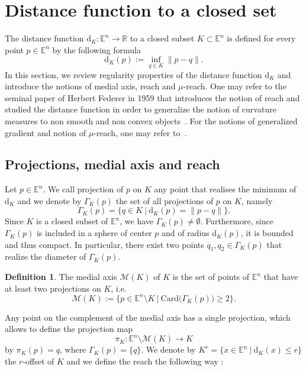 \documentclass[11pt,reqno,a4paper]{article}%
\theoremstyle{definition}
\newtheorem{definition}{Definition}[section]
\theoremstyle{remark}
\newtheorem{remark}{Remark}[section]
\renewcommand{\leq}{\leqslant}
\renewcommand{\geq}{\geqslant}
\renewcommand{\d}{\mathrm{d}}
\newcommand{\R}{\mathbb{R}}
\newcommand{\E}{\mathbb{E}}
\renewcommand{\d}{\mathrm{d}}
\begin{document}
\section{Distance function to a closed set}\label{sec:distancefunction}
The distance function $\d_K : \E^n \to \R$ to a closed subset $K\subset \E^n$ is defined for every point $p \in \E^n$ by the following formula
\[ \d_K(p) := \underset{q \in K}{\inf} \| p - q \|. \]
In this section, we review regularity properties of the distance function $\d_K$ and introduce the notions of medial axis, reach and $\mu$-reach. One may refer to the seminal paper of Herbert Federer in 1959 that introduces the notion of reach and studied the distance function in order to generalize the notion of curvature measures to non smooth and non convex objects~\cite{Federer59}. For the notions of generalized gradient and notion of $\mu$-reach, one may refer to~\cite{LIEUTIER20041029,chazal2006sampling}.
\subsection{Projections, medial axis and reach}
Let $p \in \E^n$. We call projection of $p$ on $K$ any point that realises the minimum of $\d_K$ and we denote by $\Gamma_K(p)$ the set of all projections of $p$ on $K$, namely
$$\Gamma_K(p) = \{ q \in K ~|~ \d_K(p) =  \| p - q \| \}. $$
Since $K$ is a closed subset of $\E^n$, we have $\Gamma_K(p) \neq \emptyset$. Furthermore, since $\Gamma_K(p)$ is included in a sphere of center $p$ and %
of radius $\d_K(p)$, it is bounded and thus compact. 
In particular, there exist two points $q_1, q_2 \in \Gamma_K(p)$ that realize the diameter of $\Gamma_K(p)$.

\begin{definition}
The medial axis $\mathscr{M}(K)$ of $K$ is the set of points of $\E^n$ that have at least two projections on $K$, i.e.
    \[ \mathscr{M}(K) := \big\{ p \in \E^n \setminus K ~ | ~ \mathrm{Card} \big( \Gamma_K(p) \big) \geq 2 \big\}.  \]
\end{definition}

\noindent 
Any point on the complement of the medial axis has a single projection, which allows to define the projection map 
$$\pi_K:\E^n \setminus \mathscr{M}(K) \to K$$ 
by $\pi_K(p) = q$, where $\Gamma_K(p)=\{q\}$.
We denote by $K^r = \{ x \in \E^n ~\vert ~ \d_K(x) \leq r \}$ the $r$-offset of $K$ and we define the reach the following way :
\end{document}
